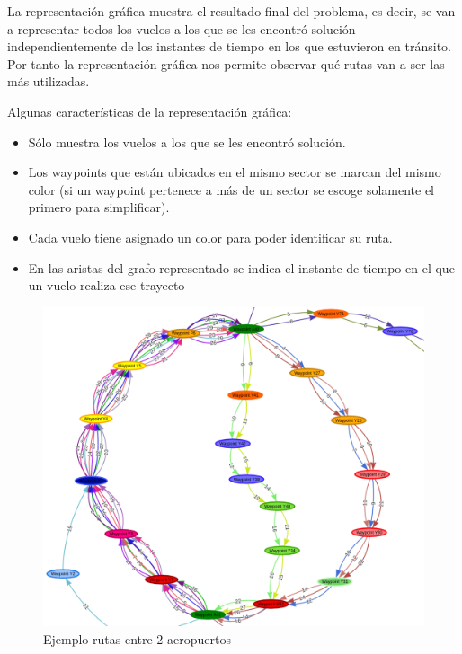 La representación gráfica muestra el resultado final del problema, es decir, se van a representar todos los vuelos a los que se les encontró solución independientemente de los instantes de tiempo en los que estuvieron en tránsito. Por tanto la representación gráfica nos permite observar qué rutas van a ser las más utilizadas.

Algunas características de la representación gráfica:
\begin{itemize}
	\item Sólo muestra los vuelos a los que se les encontró solución.
	\item Los waypoints que están ubicados en el mismo sector se marcan del mismo color (si un waypoint pertenece a más de un sector se escoge solamente el primero para simplificar).
	\item Cada vuelo tiene asignado un color para poder identificar su ruta.
	\item En las aristas del grafo representado se indica el instante de tiempo en el que un vuelo realiza ese trayecto
\end{itemize}

\begin{figure}[H]
	\begin{center}
		\centering
		\includegraphics[width=1\textwidth]{./imagenes/resultados/representacionGrafica.png}
		\caption{Ejemplo rutas entre 2 aeropuertos}
		\label{fig: Ejemplo rutas entre 2 aeropuertos}
	\end{center}
\end{figure}

